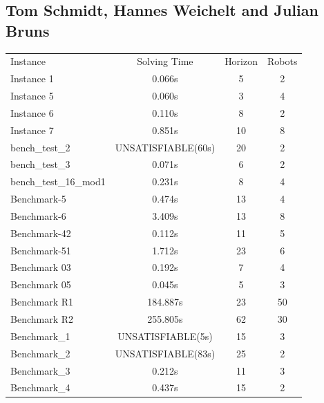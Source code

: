 \documentclass[runningheads]{llncs}
\begin{document}
\subsection{Tom Schmidt, Hannes Weichelt and Julian Bruns}
\begin{tabular}[h]{l|c|c|c}
Instance & Solving Time & Horizon & Robots \\
Instance 1 & 0.066s & 5 & 2 \\
Instance 5 & 0.060s  & 3 & 4 \\
Instance 6 & 0.110s & 8 & 2 \\
Instance 7 & 0.851s  & 10 & 8 \\
bench\_test\_2 & UNSATISFIABLE(60s) & 20 & 2 \\
bench\_test\_3 & 0.071s & 6 & 2 \\
bench\_test\_16\_mod1 & 0.231s & 8 & 4 \\
Benchmark-5 & 0.474s & 13 & 4 \\
Benchmark-6 & 3.409s & 13 & 8 \\
Benchmark-42 & 0.112s & 11 & 5 \\ 
Benchmark-51 & 1.712s & 23 & 6 \\
Benchmark 03 & 0.192s & 7 & 4 \\
Benchmark 05 & 0.045s & 5 & 3 \\
Benchmark R1 & 184.887s & 23 & 50 \\
Benchmark R2 & 255.805s & 62 & 30 \\
Benchmark\_1 & UNSATISFIABLE(5s) & 15 & 3 \\ 
Benchmark\_2 & UNSATISFIABLE(83s) & 25 & 2 \\
Benchmark\_3 & 0.212s & 11 & 3 \\
Benchmark\_4 & 0.437s & 15 & 2 \\
\end{tabular}
\end{document}
